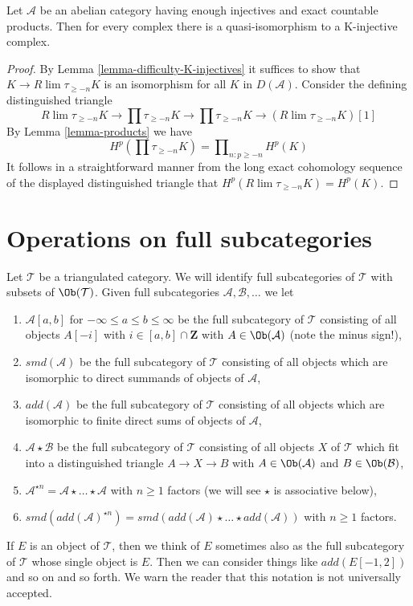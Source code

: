\begin{lemma}
\label{lemma-enough-K-injectives-Ab4-star}
Let $\mathcal{A}$ be an abelian category having enough injectives
and exact countable products. Then for every complex
there is a quasi-isomorphism to a K-injective complex.
\end{lemma}

\begin{proof}
By Lemma \ref{lemma-difficulty-K-injectives} it suffices to show that
$K \to R\lim\tau_{\geq -n}K$ is an isomorphism for all $K$ in $D(\mathcal{A})$.
Consider the defining distinguished triangle
$$
R\lim\tau_{\geq -n}K \to
\prod \tau_{\geq -n}K \to
\prod \tau_{\geq -n}K \to
(R\lim\tau_{\geq -n}K)[1]
$$
By Lemma \ref{lemma-products} we have
$$
H^p(\prod \tau_{\geq -n}K) = \prod\nolimits_{n : p \geq -n} H^p(K)
$$
It follows in a straightforward manner from the long exact cohomology
sequence of the displayed distinguished triangle
that $H^p(R\lim \tau_{\geq -n}K) = H^p(K)$.
\end{proof}




\section{Operations on full subcategories}
\label{section-operate-on-full}

\noindent
Let $\mathcal{T}$ be a triangulated category. We will identify full
subcategories of $\mathcal{T}$ with subsets of $\Ob(\mathcal{T})$.
Given full subcategories $\mathcal{A}, \mathcal{B}, \ldots$ we let
\begin{enumerate}
\item $\mathcal{A}[a, b]$ for $-\infty \leq a \leq b \leq \infty$
be the full subcategory of $\mathcal{T}$ consisting of all objects
$A[-i]$ with $i \in [a, b] \cap \mathbf{Z}$
with $A \in \Ob(\mathcal{A})$ (note the minus sign!),
\item $smd(\mathcal{A})$ be the full subcategory of $\mathcal{T}$
consisting of all objects which are isomorphic to direct summands of objects
of $\mathcal{A}$,
\item $add(\mathcal{A})$ be the full subcategory of $\mathcal{T}$
consisting of all objects which are isomorphic to finite direct sums of objects
of $\mathcal{A}$,
\item $\mathcal{A} \star \mathcal{B}$ be the full subcategory of $\mathcal{T}$
consisting of all objects $X$ of $\mathcal{T}$ which fit into a distinguished
triangle $A \to X \to B$ with $A \in \Ob(\mathcal{A})$ and
$B \in \Ob(\mathcal{B})$,
\item $\mathcal{A}^{\star n} = \mathcal{A} \star \ldots \star \mathcal{A}$
with $n \geq 1$ factors (we will see $\star$ is associative below),
\item $smd(add(\mathcal{A})^{\star n}) =
smd(add(\mathcal{A}) \star \ldots \star add(\mathcal{A}))$
with $n \geq 1$ factors.
\end{enumerate}
If $E$ is an object of $\mathcal{T}$, then we think of $E$ sometimes
also as the full subcategory of $\mathcal{T}$ whose single object is $E$.
Then we can consider things like $add(E[-1, 2])$ and so on and so forth.
We warn the reader that this notation is not universally accepted.

